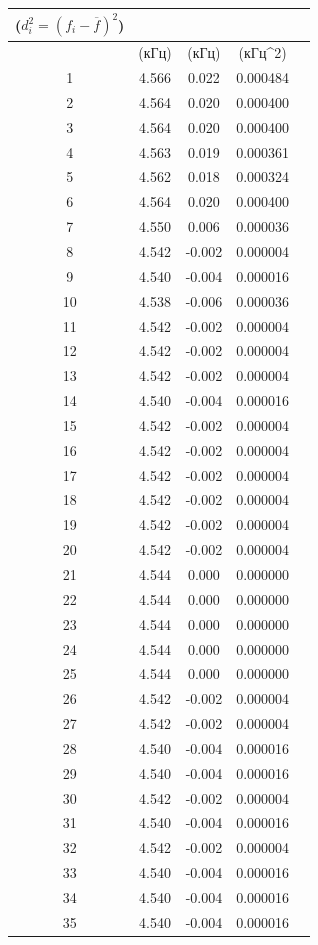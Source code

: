 \begin{center}
\begin{table}[h!]
\begin{tabular}{|c|c|c|c|c|}
\begin{minipage}{5cm}
    ($d_i^2 = (f_i - \overline{f})^2$)
\end{minipage}\\
\hline
{}&(кГц)&(кГц)&(кГц^2)\\
\hline
1  &    4.566  &  0.022 & 0.000484 \\
2  &    4.564  &  0.020 & 0.000400 \\
3  &    4.564  &  0.020 & 0.000400 \\
4  &    4.563  &  0.019 & 0.000361 \\
5  &    4.562  &  0.018 & 0.000324 \\
6  &    4.564  &  0.020 & 0.000400 \\
7  &    4.550  &  0.006 & 0.000036 \\
8  &    4.542  &  -0.002 & 0.000004 \\
9  &    4.540  &  -0.004 & 0.000016 \\
10 &	4.538  &  -0.006 & 0.000036 \\
11 &	4.542  &  -0.002 & 0.000004 \\
12 &	4.542  &  -0.002 & 0.000004 \\
13 &	4.542  &  -0.002 & 0.000004 \\
14 &	4.540  &  -0.004 & 0.000016 \\
15 &	4.542  &  -0.002 & 0.000004 \\
16 &	4.542  &  -0.002 & 0.000004 \\
17 &	4.542  &  -0.002 & 0.000004 \\
18 &	4.542  &  -0.002 & 0.000004 \\
19 &	4.542  &  -0.002 & 0.000004 \\
20 &	4.542  &  -0.002 & 0.000004 \\
21 &	4.544  &  0.000 & 0.000000 \\
22 &	4.544  &  0.000 & 0.000000 \\
23 &	4.544  &  0.000 & 0.000000 \\
24 &	4.544  &  0.000 & 0.000000 \\
25 &	4.544  &  0.000 & 0.000000 \\
26 &	4.542  &  -0.002 & 0.000004 \\
27 &	4.542  &  -0.002 & 0.000004 \\
28 &	4.540  &  -0.004 & 0.000016 \\
29 &	4.540  &  -0.004 & 0.000016 \\
30 &	4.542  &  -0.002 & 0.000004 \\
31 &	4.540  &  -0.004 & 0.000016 \\
32 &	4.542  &  -0.002 & 0.000004 \\
33 &	4.540  &  -0.004 & 0.000016 \\
34 &	4.540  &  -0.004 & 0.000016 \\
35 &	4.540  &  -0.004 & 0.000016 \\
\hline
\end{tabular}
\end{table}
\end{center}

